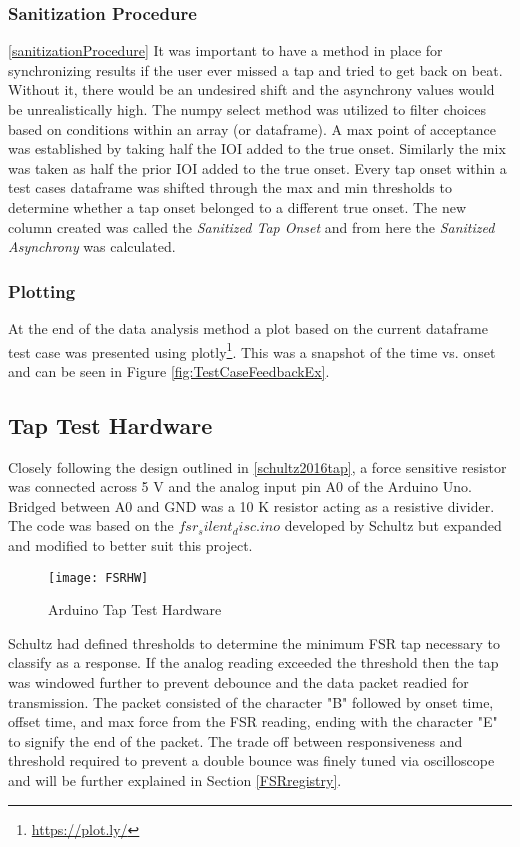 \subsubsection{Sanitization Procedure}\ref{sanitizationProcedure}
It was important to have a method in place for synchronizing results if the user ever missed a tap and tried to get back on beat. Without it, there would be an undesired shift and the asynchrony values would be unrealistically high. The numpy select method was utilized to filter choices based on conditions within an array (or dataframe). A max point of acceptance was established by taking half the IOI added to the true onset. Similarly the mix was taken as half the prior IOI added to the true onset. Every tap onset within a test cases dataframe was shifted through the max and min thresholds to determine whether a tap onset belonged to a different true onset. The new column created was called the \textit{Sanitized Tap Onset} and from here the \textit{Sanitized Asynchrony} was calculated.
\subsubsection{Plotting}
At the end of the data analysis method a plot based on the current dataframe test case was presented using plotly\footnote{\url{https://plot.ly/}}. This was a snapshot of the time vs. onset and can be seen in Figure \ref{fig:TestCaseFeedbackEx}.
\subsection{Tap Test Hardware} \label{tap_arduino}
Closely following the design outlined in \ref{schultz2016tap}, a force sensitive resistor was connected across 5 V and the analog input pin A0 of the Arduino Uno. Bridged between A0 and GND was a 10 K resistor acting as a resistive divider. The code was based on the \textit{$fsr_silent_disc.ino$} developed by Schultz but expanded and modified to better suit this project. 

\begin{figure}[H]
    \centering
    \texttt{[image: FSRHW]}
    \caption{Arduino Tap Test Hardware}
\end{figure}

Schultz had defined thresholds to determine the minimum FSR tap necessary to classify as a response. If the analog reading exceeded the threshold then the tap was windowed further to prevent debounce and the data packet readied for transmission. The packet consisted of the character "B" followed by onset time, offset time, and max force from the FSR reading, ending with the character "E" to signify the end of the packet. The trade off between responsiveness and threshold required to prevent a double bounce was finely tuned via oscilloscope and will be further explained in Section \ref{FSRregistry}.

